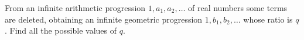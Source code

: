 From an infinite arithmetic progression $ 1,a_1,a_2,\dots$ of real numbers some terms are deleted, obtaining an infinite geometric progression $ 1,b_1,b_2,\dots$ whose ratio is $ q$. Find all the possible values of $ q$.